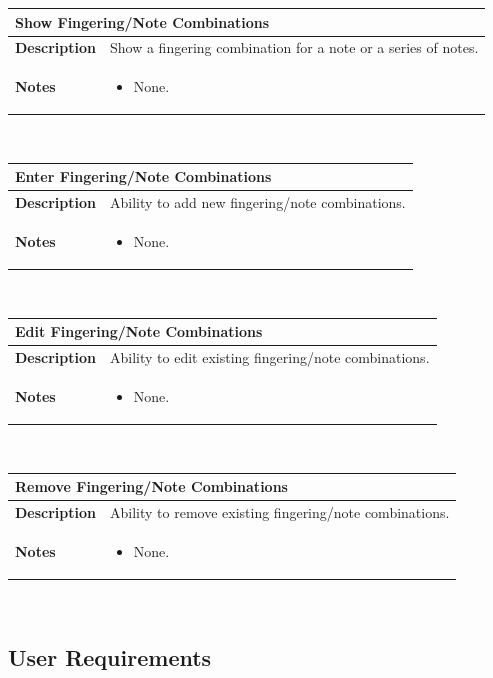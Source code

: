 \documentclass[12pt,english]{article}
\providecommand{\tabularnewline}{\\}
\begin{document}
\begin{tabular}{|p{3cm}|p{13cm}|}
\hline 
\multicolumn{2}{|l|}{\textbf{Show Fingering/Note Combinations}}\tabularnewline
\hline 
\textbf{Description}  & Show a fingering combination for a note or a series of notes. \tabularnewline
\hline 
\textbf{Notes}  & \begin{itemize}
\item None. \end{itemize}
\tabularnewline
\hline 
\end{tabular}\\[0.5cm] %
\begin{tabular}{|p{3cm}|p{13cm}|}
\hline 
\multicolumn{2}{|l|}{\textbf{Enter Fingering/Note Combinations}}\tabularnewline
\hline 
\textbf{Description}  & Ability to add new fingering/note combinations. \tabularnewline
\hline 
\textbf{Notes}  & \begin{itemize}
\item None. \end{itemize}
\tabularnewline
\hline 
\end{tabular}\\[0.5cm] %
\begin{tabular}{|p{3cm}|p{13cm}|}
\hline 
\multicolumn{2}{|l|}{\textbf{Edit Fingering/Note Combinations}}\tabularnewline
\hline 
\textbf{Description}  & Ability to edit existing fingering/note combinations. \tabularnewline
\hline 
\textbf{Notes}  & \begin{itemize}
\item None. \end{itemize}
\tabularnewline
\hline 
\end{tabular}\\[0.5cm] %
\begin{tabular}{|p{3cm}|p{13cm}|}
\hline 
\multicolumn{2}{|l|}{\textbf{Remove Fingering/Note Combinations}}\tabularnewline
\hline 
\textbf{Description}  & Ability to remove existing fingering/note combinations. \tabularnewline
\hline 
\textbf{Notes}  & \begin{itemize}
\item None. \end{itemize}
\tabularnewline
\hline 
\end{tabular}\\[0.5cm]


\subsection{User Requirements}
\end{document}
